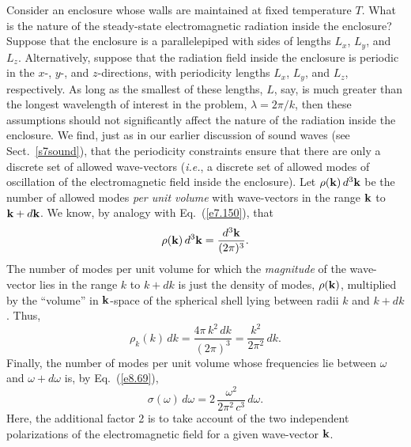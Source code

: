 Consider an enclosure whose walls are maintained at fixed
temperature $T$. What is the nature of the 
steady-state electromagnetic radiation inside
the enclosure? Suppose that the enclosure is a parallelepiped with
sides of lengths $L_x$, $L_y$, and $L_z$. Alternatively, suppose that the
radiation field inside the enclosure is periodic in the $x$-, $y$-, and $z$-directions,
with periodicity lengths $L_x$, $L_y$, and $L_z$, respectively. As long as the
smallest of these lengths, $L$, say, is much greater than the longest wavelength
of interest in the problem, $\lambda = 2\pi /k$, then these assumptions should not
significantly 
affect the nature of the radiation inside the enclosure. We find, just as in
our earlier discussion of sound waves (see Sect.~\ref{s7sound}), that the periodicity constraints ensure that
there are only a discrete set of allowed wave-vectors ({\em i.e.}, a discrete
set of allowed modes of oscillation of the electromagnetic field inside the
enclosure).
 Let $\rho({\bf k})\,
d^3{\bf k}$ be the number of allowed modes {\em per unit volume}
with wave-vectors in the range  ${\bf k}$ to ${\bf k} + d{\bf k}$. We know,
by analogy  with
Eq.~(\ref{e7.150}), that
\begin{equation}
\rho({\bf k})\,d^3{\bf k} = \frac{d^3{\bf k}}{(2\pi)^3}.
\end{equation}
The number of modes per unit volume for which the {\em magnitude}\/ of
the wave-vector lies in the range $k$ to $k+dk$ is just the density of modes,
$\rho({\bf k})$, 
multiplied by the ``volume'' in ${\bf k}$-space of the spherical shell
lying between radii $k$ and $k+dk$. Thus,
\begin{equation}
\rho_k(k)\,dk = \frac{4\pi \,k^2\,dk}{(2\pi)^3} = \frac{k^2}{2\pi^2}\, dk.
\end{equation}
Finally, the number of  modes per unit volume whose frequencies lie between
$\omega$ and $\omega + d \omega$ is, by Eq.~(\ref{e8.69}),
\begin{equation}
\sigma (\omega)\,d\omega = 2 \,\frac{\omega^2}{2\pi^2 \,c^3}\,d\omega.
\end{equation}
Here, the additional 
factor 2  is to take account of the two independent polarizations
of the electromagnetic field for a given wave-vector ${\bf k}$. 


